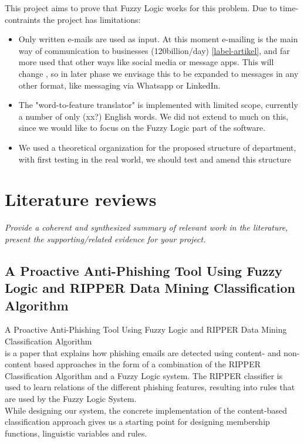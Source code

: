 \documentclass[a4paper]{article}
\begin{document}
This project aims to prove that Fuzzy Logic works for this problem. Due to time-contraints the project has limitations:
\begin{itemize}
    \item Only written e-mails are used as input. At this moment e-mailing is the main way of communication to businesses (120billion/day) \ref{label-artikel}, and far more used that other ways like social media or message apps. This will change , so in later phase we envisage this to be expanded to messages in any other format, like messaging via Whatsapp or LinkedIn.
    \item The "word-to-feature translator" is implemented with limited scope, currently a number of only (xx?) English words. We did not extend to much on this, since we would like to focus on the Fuzzy Logic part of the software.
    \item We used a theoretical organization for the proposed structure of department, with first testing in the real world, we should test and amend this structure
\end{itemize}
\section{Literature reviews}

\textit{Provide a coherent and synthesized summary of relevant work in the
literature, present the supporting/related evidence for your project.} \\

\subsection{A Proactive Anti-Phishing Tool Using Fuzzy Logic and RIPPER Data Mining Classification Algorithm}

A Proactive Anti-Phishing Tool Using Fuzzy Logic and RIPPER Data Mining Classification Algorithm \cite{phishing} \\ is a paper that explains how phishing emails are detected using content- and non-content based approaches in the form of a combination of the RIPPER Classification Algorithm and a Fuzzy Logic system. The RIPPER classifier is used to learn relations of the different phishing features, resulting into rules that are used by the Fuzzy Logic System. \\

While designing our system, the concrete implementation of the content-based classification approach gives us a starting point for designing membership functions, linguistic variables and rules.
\end{document}
